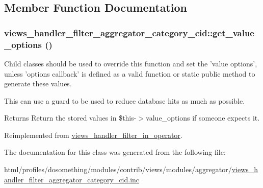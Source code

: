 \subsection{Member Function Documentation}
\hypertarget{classviews__handler__filter__aggregator__category__cid_ad0fa87d5c7f9bcb955b163c6587cd790}{
\subsubsection[{get\_\-value\_\-options}]{\setlength{\rightskip}{0pt plus 5cm}views\_\-handler\_\-filter\_\-aggregator\_\-category\_\-cid::get\_\-value\_\-options ()}}
\label{classviews__handler__filter__aggregator__category__cid_ad0fa87d5c7f9bcb955b163c6587cd790}
Child classes should be used to override this function and set the 'value options', unless 'options callback' is defined as a valid function or static public method to generate these values.

This can use a guard to be used to reduce database hits as much as possible.

\begin{DoxyReturn}{Returns}
Return the stored values in \$this-\/$>$value\_\-options if someone expects it. 
\end{DoxyReturn}


Reimplemented from \hyperlink{classviews__handler__filter__in__operator_aa5b5df6d90f4359ed28c0c446bdc81a6}{views\_\-handler\_\-filter\_\-in\_\-operator}.

The documentation for this class was generated from the following file:\begin{DoxyCompactItemize}
\item 
html/profiles/dosomething/modules/contrib/views/modules/aggregator/\hyperlink{views__handler__filter__aggregator__category__cid_8inc}{views\_\-handler\_\-filter\_\-aggregator\_\-category\_\-cid.inc}\end{DoxyCompactItemize}
